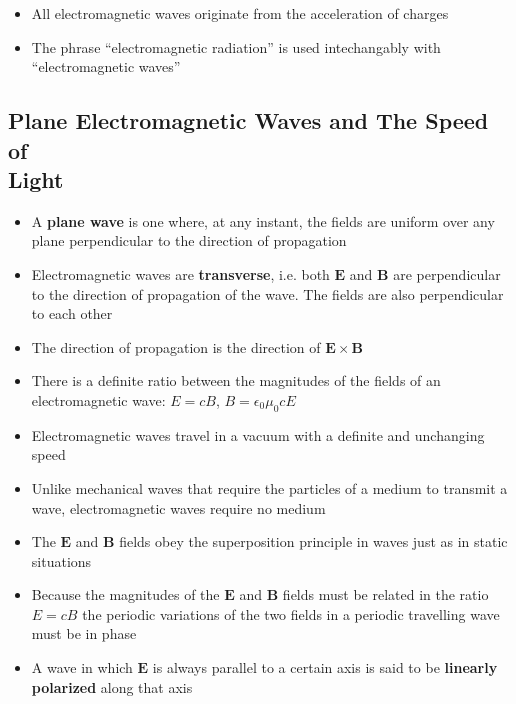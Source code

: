 \documentclass{article}
\begin{document}
\begin{itemize}
  \item All electromagnetic waves originate from the acceleration of charges

  \item The phrase ``electromagnetic radiation'' is used intechangably with ``electromagnetic waves''
\end{itemize}

\subsection{Plane Electromagnetic Waves and The Speed of \\ Light}

\begin{itemize}
  \item A \textbf{plane wave} is one where, at any instant, the fields are uniform over any plane perpendicular to the direction of propagation

  \item Electromagnetic waves are \textbf{transverse}, i.e. both $\mathbf{E}$ and $\mathbf{B}$ are perpendicular to the direction of propagation of the wave. The fields are also perpendicular to each other

  \item The direction of propagation is the direction of $\mathbf{E} \times \mathbf{B}$

\item There is a definite ratio between the magnitudes of the fields of an electromagnetic wave: $E = c B$, $B = \epsilon_0 \mu_0 c E$

  \item Electromagnetic waves travel in a vacuum with a definite and unchanging speed

  \item Unlike mechanical waves that require the particles of a medium to transmit a wave, electromagnetic waves require no medium

  \item The $\mathbf{E}$ and $\mathbf{B}$ fields obey the superposition principle in waves just as in static situations

  \item Because the magnitudes of the $\mathbf{E}$ and $\mathbf{B}$ fields must be related in the ratio $E = c B$ the periodic variations of the two fields in a periodic travelling wave must be in phase

  \item A wave in which $\mathbf{E}$ is always parallel to a certain axis is said to be \textbf{linearly polarized} along that axis
\end{itemize}
\end{document}
